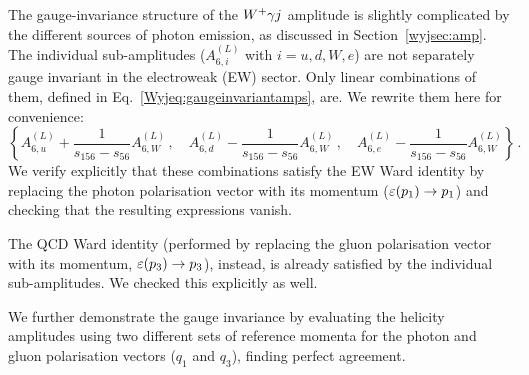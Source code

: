 \documentclass[main.tex]{subfiles}
\begin{document}
The gauge-invariance structure of the $W^+\gamma j$ amplitude is slightly complicated by the different sources of photon emission, as discussed in Section~\ref{wyjsec:amp}.
The individual sub-amplitudes ($A^{(L)}_{6,i}$ with $i=u,d,W,e$) are not separately gauge invariant in the electroweak (EW) sector. Only linear combinations of them, defined in 
Eq.~\ref{Wyjeq:gaugeinvariantamps}, are. We rewrite them here for convenience:
\begin{equation} \label{Wyjeq:gaugeinvcombinations}
\left\{ A^{(L)}_{6,u} + \frac{1}{s_{156}-s_{56}} A^{(L)}_{6,W} \,, \quad 
 A^{(L)}_{6,d} - \frac{1}{s_{156}-s_{56}} A^{(L)}_{6,W} \,, \quad 
 A^{(L)}_{6,e} - \frac{1}{s_{156}-s_{56}} A^{(L)}_{6,W} \right\} \,.
\end{equation}
We verify explicitly that these combinations satisfy the EW Ward identity by replacing the photon polarisation vector with its momentum ($\varepsilon(p_1) \to p_1$) and checking that the resulting expressions vanish.

The QCD Ward identity (performed by replacing the gluon polarisation vector with its momentum, $\varepsilon(p_3) \to p_3$), instead, is already satisfied by the individual sub-amplitudes. We checked this explicitly as well.

We further demonstrate the gauge invariance by evaluating the helicity amplitudes using two different sets of reference momenta for the photon and gluon polarisation vectors ($q_1$ and $q_3$), finding perfect agreement.
\end{document}
